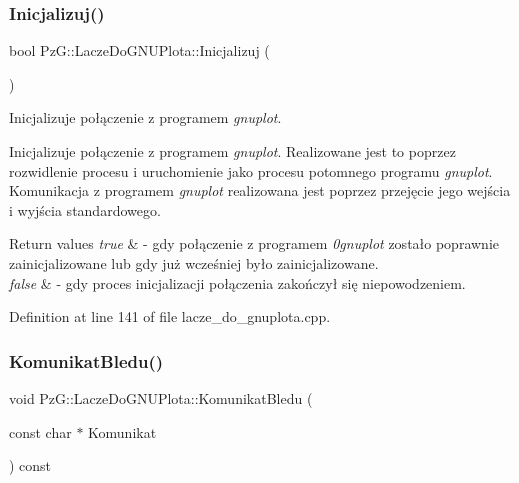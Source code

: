 \subsubsection{\texorpdfstring{Inicjalizuj()}{Inicjalizuj()}}
{\footnotesize\ttfamily bool Pz\+G\+::\+Lacze\+Do\+G\+N\+U\+Plota\+::\+Inicjalizuj (\begin{DoxyParamCaption}{ }\end{DoxyParamCaption})}



Inicjalizuje połączenie z programem {\itshape gnuplot}. 

Inicjalizuje połączenie z programem {\itshape gnuplot}. Realizowane jest to poprzez rozwidlenie procesu i uruchomienie jako procesu potomnego programu {\itshape gnuplot}. Komunikacja z programem {\itshape gnuplot} realizowana jest poprzez przejęcie jego wejścia i wyjścia standardowego.


\begin{DoxyRetVals}{Return values}
{\em true} & -\/ gdy połączenie z programem {\itshape 0gnuplot} zostało poprawnie zainicjalizowane lub gdy już wcześniej było zainicjalizowane. \\
\hline
{\em false} & -\/ gdy proces inicjalizacji połączenia zakończył się niepowodzeniem. \\
\hline
\end{DoxyRetVals}


Definition at line 141 of file lacze\+\_\+do\+\_\+gnuplota.\+cpp.

\mbox{\label{class_pz_g_1_1_lacze_do_g_n_u_plota_a90056743aeaa546721528005f2cf41e6}} 
\subsubsection{\texorpdfstring{Komunikat\+Bledu()}{KomunikatBledu()}}
{\footnotesize\ttfamily void Pz\+G\+::\+Lacze\+Do\+G\+N\+U\+Plota\+::\+Komunikat\+Bledu (\begin{DoxyParamCaption}\item[{const char $\ast$}]{Komunikat }\end{DoxyParamCaption}) const\hspace{0.3cm}{\ttfamily [protected]}}

